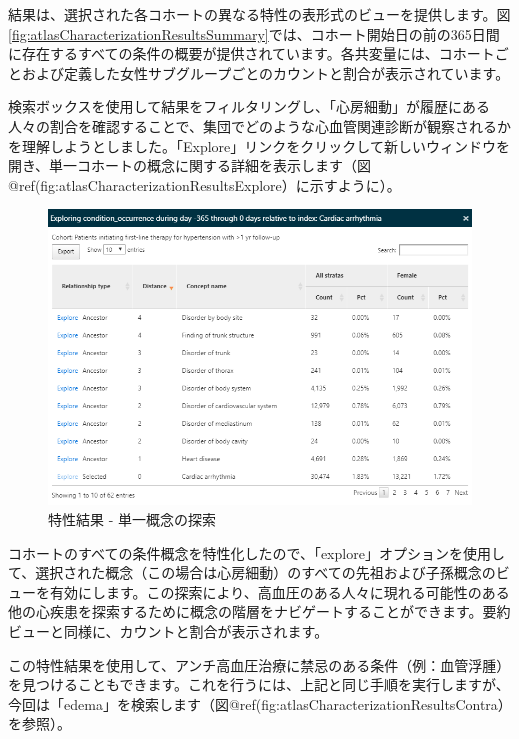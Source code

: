 \documentclass[
  11pt]{book}
\theoremstyle{definition}
\theoremstyle{definition}
\theoremstyle{definition}
\theoremstyle{definition}
\theoremstyle{remark}
\begin{document}
結果は、選択された各コホートの異なる特性の表形式のビューを提供します。図\ref{fig:atlasCharacterizationResultsSummary}では、コホート開始日の前の365日間に存在するすべての条件の概要が提供されています。各共変量には、コホートごとおよび定義した女性サブグループごとのカウントと割合が表示されています。

検索ボックスを使用して結果をフィルタリングし、「心房細動」が履歴にある人々の割合を確認することで、集団でどのような心血管関連診断が観察されるかを理解しようとしました。「Explore」リンクをクリックして新しいウィンドウを開き、単一コホートの概念に関する詳細を表示します（図@ref(fig:atlasCharacterizationResultsExplore）に示すように）。

\begin{figure}

{\centering \includegraphics[width=1\linewidth]{images/Characterization/atlasCharacterizationResultsExplore} 

}

\caption{特性結果 - 単一概念の探索}\label{fig:atlasCharacterizationResultsExplore}
\end{figure}

コホートのすべての条件概念を特性化したので、「explore」オプションを使用して、選択された概念（この場合は心房細動）のすべての先祖および子孫概念のビューを有効にします。この探索により、高血圧のある人々に現れる可能性のある他の心疾患を探索するために概念の階層をナビゲートすることができます。要約ビューと同様に、カウントと割合が表示されます。

この特性結果を使用して、アンチ高血圧治療に禁忌のある条件（例：血管浮腫）を見つけることもできます。これを行うには、上記と同じ手順を実行しますが、今回は「edema」を検索します（図@ref(fig:atlasCharacterizationResultsContra）を参照）。
\end{document}
